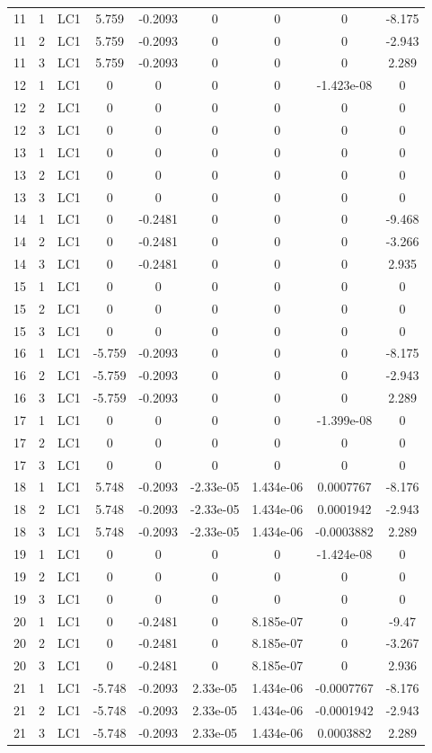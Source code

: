 \documentclass{article}%
\begin{document}
\begin{longtable}{| c c c | c c c c c c |}
11&1&LC1&5.759&{-}0.2093&0&0&0&{-}8.175\\%
11&2&LC1&5.759&{-}0.2093&0&0&0&{-}2.943\\%
11&3&LC1&5.759&{-}0.2093&0&0&0&2.289\\%
12&1&LC1&0&0&0&0&{-}1.423e{-}08&0\\%
12&2&LC1&0&0&0&0&0&0\\%
12&3&LC1&0&0&0&0&0&0\\%
13&1&LC1&0&0&0&0&0&0\\%
13&2&LC1&0&0&0&0&0&0\\%
13&3&LC1&0&0&0&0&0&0\\%
14&1&LC1&0&{-}0.2481&0&0&0&{-}9.468\\%
14&2&LC1&0&{-}0.2481&0&0&0&{-}3.266\\%
14&3&LC1&0&{-}0.2481&0&0&0&2.935\\%
15&1&LC1&0&0&0&0&0&0\\%
15&2&LC1&0&0&0&0&0&0\\%
15&3&LC1&0&0&0&0&0&0\\%
16&1&LC1&{-}5.759&{-}0.2093&0&0&0&{-}8.175\\%
16&2&LC1&{-}5.759&{-}0.2093&0&0&0&{-}2.943\\%
16&3&LC1&{-}5.759&{-}0.2093&0&0&0&2.289\\%
17&1&LC1&0&0&0&0&{-}1.399e{-}08&0\\%
17&2&LC1&0&0&0&0&0&0\\%
17&3&LC1&0&0&0&0&0&0\\%
18&1&LC1&5.748&{-}0.2093&{-}2.33e{-}05&1.434e{-}06&0.0007767&{-}8.176\\%
18&2&LC1&5.748&{-}0.2093&{-}2.33e{-}05&1.434e{-}06&0.0001942&{-}2.943\\%
18&3&LC1&5.748&{-}0.2093&{-}2.33e{-}05&1.434e{-}06&{-}0.0003882&2.289\\%
19&1&LC1&0&0&0&0&{-}1.424e{-}08&0\\%
19&2&LC1&0&0&0&0&0&0\\%
19&3&LC1&0&0&0&0&0&0\\%
20&1&LC1&0&{-}0.2481&0&8.185e{-}07&0&{-}9.47\\%
20&2&LC1&0&{-}0.2481&0&8.185e{-}07&0&{-}3.267\\%
20&3&LC1&0&{-}0.2481&0&8.185e{-}07&0&2.936\\%
21&1&LC1&{-}5.748&{-}0.2093&2.33e{-}05&1.434e{-}06&{-}0.0007767&{-}8.176\\%
21&2&LC1&{-}5.748&{-}0.2093&2.33e{-}05&1.434e{-}06&{-}0.0001942&{-}2.943\\%
21&3&LC1&{-}5.748&{-}0.2093&2.33e{-}05&1.434e{-}06&0.0003882&2.289\\%

\end{longtable}
\end{document}
